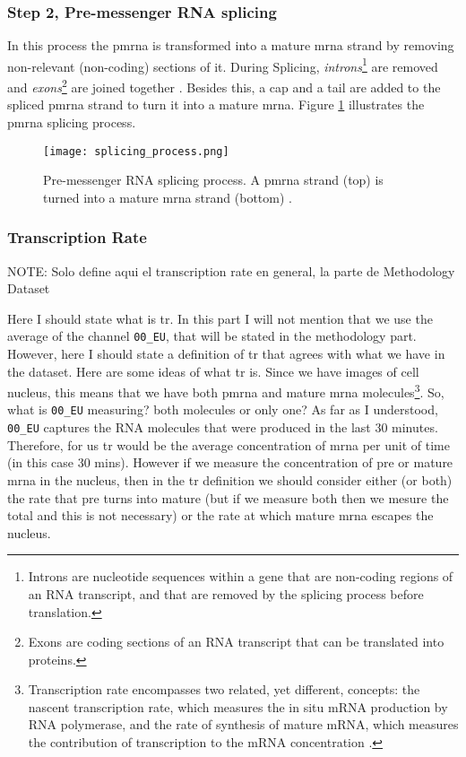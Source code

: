 \subsubsection{Step 2, Pre-messenger RNA splicing}
In this process the \gls{pmrna} is transformed into a mature \gls{mrna} strand by removing non-relevant (non-coding) sections of it.
During Splicing, \textit{introns}\footnote{Introns are nucleotide sequences within a gene that are non-coding regions of an RNA transcript, and that are removed by the splicing process before translation.} are removed and \textit{exons}\footnote{Exons are coding sections of an RNA transcript that can be translated into proteins.} are joined together \cite{Biochemistry}. Besides this, a cap and a tail are added to the spliced \gls{pmrna} strand to turn it into a mature \gls{mrna}. Figure \ref{fig:BB:splicing} illustrates the \gls{pmrna} splicing process.

\begin{figure}[htb]
  \centering
  \texttt{[image: splicing\_process.png]}
  \caption{Pre-messenger RNA splicing process. A \gls{pmrna} strand (top) is turned into a mature \gls{mrna} strand (bottom) \cite{wiki:Primary_transcript}.}
  \label{fig:BB:splicing}
\end{figure}

\subsubsection{Transcription Rate}

NOTE: Solo define aqui el transcription rate en general, la parte de Methodology Dataset

Here I should state what is \gls{tr}. In this part I will not mention that we use the average of the channel \texttt{00\_EU}, that will be stated in the methodology part. However, here I should state a definition of \gls{tr} that agrees with what we have in the dataset. Here are some ideas of what \gls{tr} is.
Since we have images of cell nucleus, this means that we have both \gls{pmrna} and mature \gls{mrna} molecules\footnote{Transcription rate encompasses two related, yet different, concepts: the nascent transcription rate, which measures the in situ mRNA production by RNA polymerase, and the rate of synthesis of mature mRNA, which measures the contribution of transcription to the mRNA concentration \cite{what_is_tr}.}. So, what is \texttt{00\_EU} measuring? both molecules or only one?
As far as I understood, \texttt{00\_EU} captures the RNA molecules that were produced in the last 30 minutes. Therefore, for us \gls{tr} would be the average concentration of \gls{mrna} per unit of time (in this case 30 mins). However if we measure the concentration of pre or mature \gls{mrna} in the nucleus, then in the \gls{tr} definition we should consider either (or both) the rate that pre turns into mature (but if we measure both then we mesure the total and this is not necessary) or the rate at which mature \gls{mrna} escapes the nucleus.


